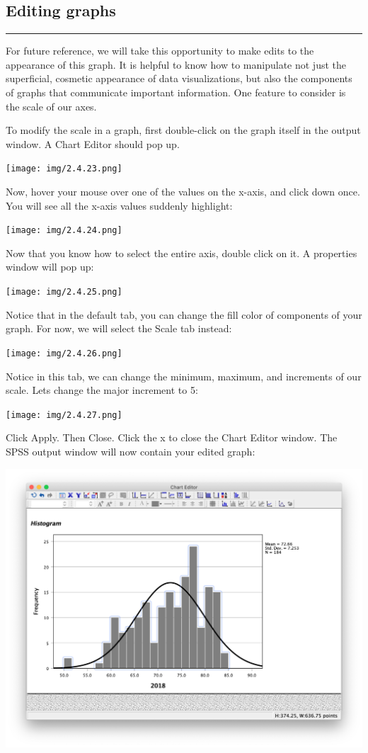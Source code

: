 \documentclass[]{book}
\begin{document}
\subsection{Editing graphs}\label{editing-graphs}

\begin{center}\rule{0.5\linewidth}{0.5pt}\end{center}

For future reference, we will take this opportunity to make edits to the
appearance of this graph. It is helpful to know how to manipulate not
just the superficial, cosmetic appearance of data visualizations, but
also the components of graphs that communicate important information.
One feature to consider is the scale of our axes.

To modify the scale in a graph, first {double-click} on the graph itself
in the output window. A Chart Editor should pop up.

\texttt{[image: img/2.4.23.png]}

Now, hover your mouse over one of the values on the x-axis, and click
down once. You will see all the x-axis values suddenly highlight:

\texttt{[image: img/2.4.24.png]}

Now that you know how to select the entire axis, {double click} on it. A
properties window will pop up:

\texttt{[image: img/2.4.25.png]}

Notice that in the default tab, you can change the fill color of
components of your graph. For now, we will select the {Scale} tab
instead:

\texttt{[image: img/2.4.26.png]}

Notice in this tab, we can change the minimum, maximum, and increments
of our scale. Lets change the major increment to 5:

\texttt{[image: img/2.4.27.png]}

Click {Apply}. Then {Close}. Click the x to close the Chart Editor
window. The SPSS output window will now contain your edited graph:

\includegraphics{img/2.4.28.png}
\end{document}
